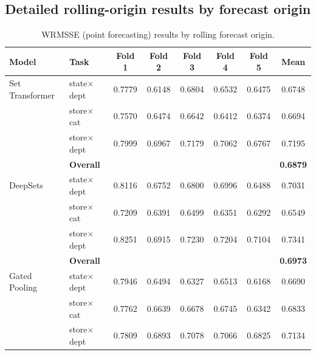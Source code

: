 \documentclass[12pt]{article}
\begin{document}
\clearpage
\subsection{Detailed rolling-origin results by forecast origin}

\begin{table}[H]
  \centering
  \caption{WRMSSE (point forecasting) results by rolling forecast origin.}
  \label{tab:appendix_rolling_folds_point}
  \begin{threeparttable}
    \footnotesize
    \begin{tabular}{llccccc|c}
      \toprule
      \textbf{Model} & \textbf{Task} & \textbf{Fold 1} & \textbf{Fold 2} & \textbf{Fold 3} & \textbf{Fold 4} & \textbf{Fold 5} & \textbf{Mean} \\
      \midrule
      Set Transformer              & state$\times$dept      &   0.7779 &   0.6148 &   0.6804 &   0.6532 &   0.6475 &   0.6748 \\
                                   & store$\times$cat       &   0.7570 &   0.6474 &   0.6642 &   0.6412 &   0.6374 &   0.6694 \\
                                   & store$\times$dept      &   0.7999 &   0.6967 &   0.7179 &   0.7062 &   0.6767 &   0.7195 \\
                                   & {\bf Overall} & & & & & & {\bf 0.6879} \\
      \addlinespace
      DeepSets                     & state$\times$dept      &   0.8116 &   0.6752 &   0.6800 &   0.6996 &   0.6488 &   0.7031 \\
                                   & store$\times$cat       &   0.7209 &   0.6391 &   0.6499 &   0.6351 &   0.6292 &   0.6549 \\
                                   & store$\times$dept      &   0.8251 &   0.6915 &   0.7230 &   0.7204 &   0.7104 &   0.7341 \\
                                   & {\bf Overall} & & & & & & {\bf 0.6973} \\
      \addlinespace
      Gated Pooling                & state$\times$dept      &   0.7946 &   0.6494 &   0.6327 &   0.6513 &   0.6168 &   0.6690 \\
                                   & store$\times$cat       &   0.7762 &   0.6639 &   0.6678 &   0.6745 &   0.6342 &   0.6833 \\
                                   & store$\times$dept      &   0.7809 &   0.6893 &   0.7078 &   0.7066 &   0.6825 &   0.7134 \\

\end{tabular}
\end{threeparttable}
\end{table}
\end{document}
